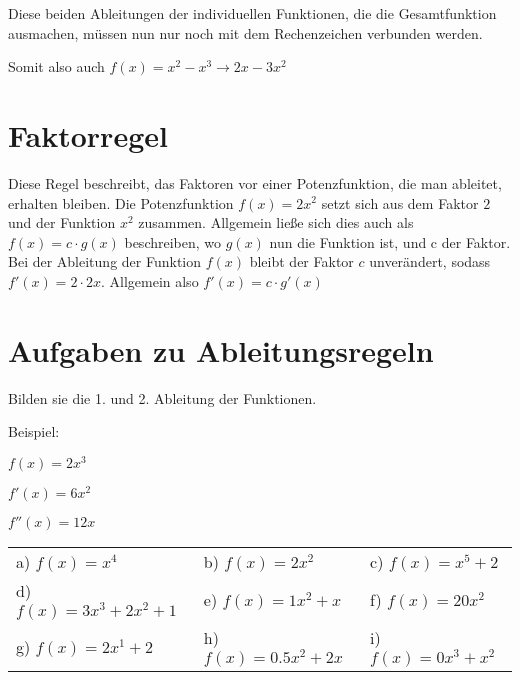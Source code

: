 \documentclass[10pt,a4paper]{article}
\begin{document}
Diese beiden Ableitungen der individuellen Funktionen, die die Gesamtfunktion
ausmachen, müssen nun nur noch mit dem Rechenzeichen verbunden werden.

Somit also auch $f(x) = x^2 - x^3 \rightarrow 2x - 3x^2$

\section*{Faktorregel}
Diese Regel beschreibt, das Faktoren vor einer Potenzfunktion, die man ableitet, erhalten bleiben.
Die Potenzfunktion $f(x) = 2x^2$ setzt sich aus dem Faktor $2$ und der Funktion $x^2$ zusammen.
Allgemein ließe sich dies auch als $f(x) = c \cdot g(x)$ beschreiben, wo $g(x)$ nun die Funktion ist,
und c der Faktor.
Bei der Ableitung der Funktion $f(x)$ bleibt der Faktor $c$ unverändert, sodass
$f'(x) = 2 \cdot 2x$.
Allgemein also $f'(x) = c \cdot g'(x)$ 

\section*{Aufgaben zu Ableitungsregeln}
Bilden sie die 1. und 2. Ableitung der Funktionen. \newline

Beispiel:

$f(x) = 2x^3$

$f'(x) = 6x^2$ 

$f''(x) = 12x$
\newline

\begin{tabular}{l l l}

	a) $f(x) = x^4$             & b) $f(x) = 2x^2$        & c) $f(x) = x^5 + 2$ \\
	d) $f(x) = 3x^3 + 2x^2 + 1$ & e) $f(x) = 1x^2 + x$    & f) $f(x) = 20x^2$ \\
	g) $f(x) = 2x^1 + 2$        & h) $f(x) = 0.5x^2 + 2x$ & i) $f(x) = 0x^3 + x^2$

\end{tabular}
\end{document}
